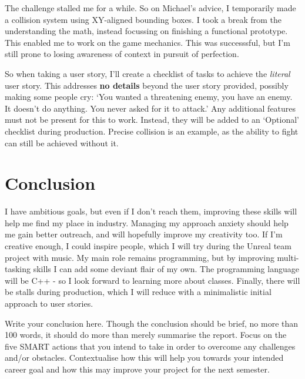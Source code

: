 \documentclass{scrartcl}
\begin{document}
The challenge stalled me for a while. So on Michael's advice, I temporarily made a collision system using XY-aligned bounding boxes. I took a break from the understanding the math, instead focussing on finishing a functional prototype. This enabled me to work on the game mechanics. This was successsful, but I'm still prone to losing awareness of context in pursuit of perfection.

So when taking a user story, I'll create a checklist of tasks to achieve the \textit{literal} user story. This addresses \textbf{no details} beyond the user story provided, possibly making some people cry: `You wanted a threatening enemy, you have an enemy. It doesn't do anything. You never asked for it to attack.' Any additional features must not be present for this to work. Instead, they will be added to an `Optional' checklist during production. Precise collision is an example, as the ability to fight can still be achieved without it.

\section{Conclusion}

I have ambitious goals, but even if I don't reach them, improving these skills will help me find my place in industry. Managing my approach anxiety should help me gain better outreach, and will hopefully improve my creativity too. If I'm creative enough, I could inspire people, which I will try during the Unreal team project with music. My main role remains programming, but by improving multi-tasking skills I can add some deviant flair of my own. The programming language will be C++ - so I look forward to learning more about classes. Finally, there will be stalls during production, which I will reduce with a minimalistic initial approach to user stories.



Write your conclusion here. Though the conclusion should be brief, no more than 100 words, it should do more than merely summarise the report. Focus on the five SMART actions that you intend to take in order to overcome any challenges and/or obstacles. Contextualise how this will help you towards your intended career goal and how this may improve your project for the next semester.



\end{document}
